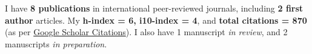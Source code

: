 
I have \textbf{8 publications} in international peer-reviewed journals, including \textbf{2 first author} articles. My \textbf{h-index = 6, i10-index = 4}, and \textbf{total citations = 870} (as per \href{https://scholar.google.com/citations?hl=en&user=6-7FYjIAAAAJ&authuser=2}{Google Scholar Citations}). I also have 1 manuscript \emph{in review}, and 2 manuscripts \emph{in preparation}.

\nocite{*}


\printbibliography[heading={none},title={Journal Articles},type=article]



